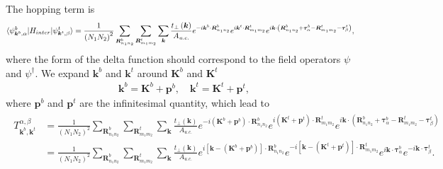 \documentclass[10pt, oneside]{article}
\newcommand{\p}[1]{\left(#1\right)}
\newcommand{\bb}[1]{\left[#1\right]}
\begin{document}
The hopping term is 
\begin{align}
	\begin{split}
		\braket{\psi^{b}_{\bm{k}^{b},\alpha} | H_{inter} | \psi^{t}_{\bm{k}^{t},\beta}} &=
		\frac{1}{\p{N_1 N_2}^2} \sum_{\bm{R}^{b}_{n_1 n_2}} \sum_{\bm{R}^{t}_{m_1 m_2}} \sum_{\bm{k}} \frac{t_{\perp} \p{\bm{k}}}{A_{u.c.}} e^{- i \bm{k}^{b} \cdot \bm{R}^{b}_{n_1 n_2}} e^{i \bm{k}^{t} \cdot  \bm{R}^{t}_{m_1 m_2}} e^{  i \bm{k} \cdot \p{\bm{R}^{b}_{n_1 n_2} + \bm{\tau}^{b}_{\alpha} - \bm{R}^{t}_{m_1 m_2}  - \bm{\tau}^{t}_{\beta}} },
	\end{split}
\end{align}
where the form of the delta function should correspond to the field operators \(\psi\) and \(\psi^\dagger\). We expand \(\bm{k}^{b}\) and \(\bm{k}^{t}\) around \(\bm{K}^{b}\) and \(\bm{K}^{t}\)
\begin{align}
	\bm{k}^{b} = \bm{K}^{b} + \bm{p}^{b}, \quad \bm{k}^{t} = \bm{K}^{t} + \bm{p}^{t},
\end{align}
where \(\bm{p}^{b}\) and \(\bm{p}^{t}\) are the infinitesimal quantity, which lead to 
\begin{align}
	\begin{split}
		T^{\alpha, \beta}_{\bm{k}^{b}, \bm{k}^{t}} & = \frac{1}{\p{N_1 N_2}^2} \sum_{\bm{R}^{b}_{n_1 n_2}} \sum_{\bm{R}^{t}_{m_1 m_2}} \sum_{\bm{k}} \frac{t_{\perp} \p{\bm{k}}}{A_{u.c.}} e^{- i \p{\bm{K}^{b} + \bm{p}^{b}} \cdot \bm{R}^{b}_{n_1 n_2}} e^{i\p{\bm{K}^{t} + \bm{p}^{t}} \cdot  \bm{R}^{t}_{m_1 m_2}} e^{  i \bm{k} \cdot \p{\bm{R}^{b}_{n_1 n_2} + \bm{\tau}^{b}_{\alpha} - \bm{R}^{t}_{m_1 m_2}  - \bm{\tau}^{t}_{\beta}} } \\
		& = \frac{1}{\p{N_1 N_2}^2} \sum_{\bm{R}^{b}_{n_1 n_2}} \sum_{\bm{R}^{t}_{m_1 m_2}} \sum_{\bm{k}} \frac{t_{\perp} \p{\bm{k}}}{A_{u.c.}} e^{ i \bb{\bm{k} - \p{\bm{K}^{b} + \bm{p}^{b}}} \cdot \bm{R}^{b}_{n_1 n_2}}  e^{  - i \bb{\bm{k} - \p{\bm{K}^{t} + \bm{p}^{t}}} \cdot \bm{R}^{t}_{m_1 m_2}} e^{i \bm{k} \cdot \bm{\tau}^{b}_{\alpha} } e^{ - i \bm{k} \cdot \bm{\tau}^{t}_{\beta} }.
	\end{split}
\end{align}
\end{document}
